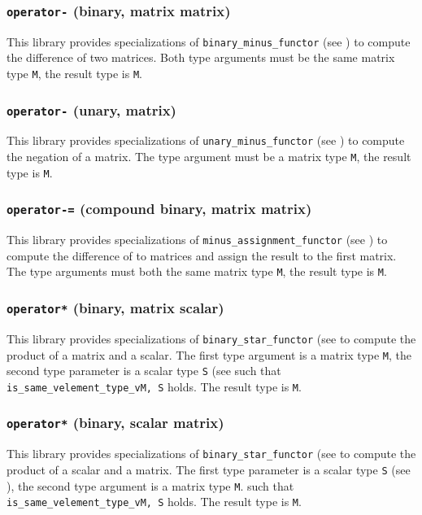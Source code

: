 \documentclass[oneside]{book}
\begin{document}
\subsubsection{\texttt{operator-} (binary, matrix matrix)}
This library provides specializations of
\texttt{binary\_minus\_functor}
(see \cite{arithmeticfunctors}) to compute the
difference
of two matrices. Both type arguments must be the same matrix type \texttt{M}, the result type is \texttt{M}.

\subsubsection{\texttt{operator-} (unary, matrix)}
This library provides specializations of
\texttt{unary\_minus\_functor}
(see \cite{arithmeticfunctors}) to compute
the negation
of a matrix.
The type argument must be a matrix type \texttt{M}, the result type is \texttt{M}.

\subsubsection{\texttt{operator-=} (compound binary, matrix matrix)}
This library provides specializations of
\texttt{minus\_assignment\_functor}
(see \cite{arithmeticfunctors}) to compute
the difference of to matrices and assign the result to the first matrix.
The type arguments must both the same matrix type \texttt{M}, the result type is \texttt{M}.

\subsubsection{\texttt{operator*} (binary, matrix scalar)}
This library provides specializations of
\texttt{binary\_star\_functor}
(see \cite{arithmeticfunctors} to compute the
product of a matrix and a scalar.
The first type argument is a matrix type \texttt{M}, the second type parameter is a scalar type \texttt{S} (see \cite{mathscalars}
such that \texttt{is\_same\_v\textlangle element\_type\_v\textlangle M\textrangle, S\textrangle} holds.
The result type is \texttt{M}.

\subsubsection{\texttt{operator*} (binary, scalar matrix)}
This library provides specializations of
\texttt{binary\_star\_functor}
(see \cite{arithmeticfunctors} to compute the
product of a scalar and a matrix.
The first type parameter is a scalar type \texttt{S} (see \cite{mathscalars}), the second type argument is a matrix type \texttt{M}.
such that \texttt{is\_same\_v\textlangle element\_type\_v\textlangle M\textrangle, S\textrangle} holds.
The result type is \texttt{M}.
\end{document}
